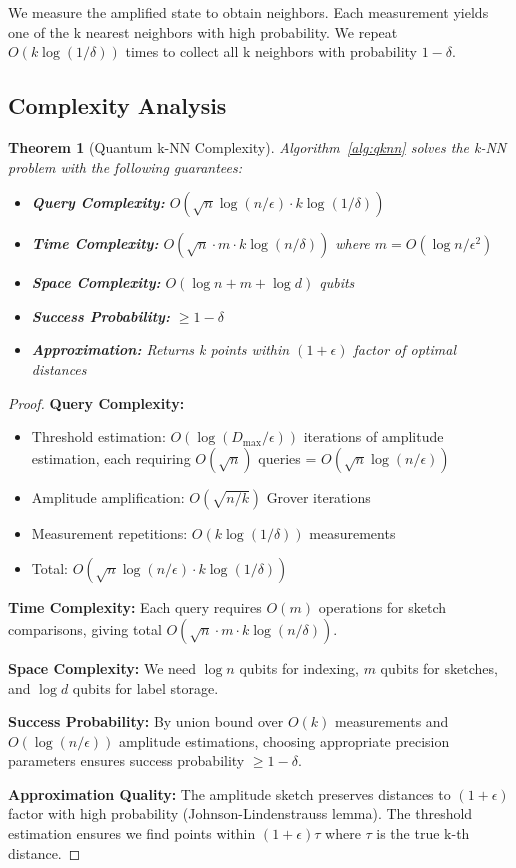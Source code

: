 \documentclass[11pt]{article}
\newtheorem{theorem}{Theorem}
\begin{document}
We measure the amplified state to obtain neighbors. Each measurement yields one of the k nearest neighbors with high probability. We repeat $O(k \log(1/\delta))$ times to collect all k neighbors with probability $1-\delta$.

\subsection{Complexity Analysis}

\begin{theorem}[Quantum k-NN Complexity]
\label{thm:qknn_complexity}
Algorithm~\ref{alg:qknn} solves the k-NN problem with the following guarantees:
\begin{itemize}
    \item \textbf{Query Complexity:} $O(\sqrt{n} \log(n/\epsilon) \cdot k \log(1/\delta))$
    \item \textbf{Time Complexity:} $O(\sqrt{n} \cdot m \cdot k \log(n/\delta))$ where $m = O(\log n / \epsilon^2)$
    \item \textbf{Space Complexity:} $O(\log n + m + \log d)$ qubits
    \item \textbf{Success Probability:} $\geq 1 - \delta$
    \item \textbf{Approximation:} Returns k points within $(1+\epsilon)$ factor of optimal distances
\end{itemize}
\end{theorem}

\begin{proof}
\textbf{Query Complexity:} 
\begin{itemize}
    \item Threshold estimation: $O(\log(D_{\max}/\epsilon))$ iterations of amplitude estimation, each requiring $O(\sqrt{n})$ queries = $O(\sqrt{n} \log(n/\epsilon))$
    \item Amplitude amplification: $O(\sqrt{n/k})$ Grover iterations
    \item Measurement repetitions: $O(k \log(1/\delta))$ measurements
    \item Total: $O(\sqrt{n} \log(n/\epsilon) \cdot k \log(1/\delta))$
\end{itemize}

\textbf{Time Complexity:} Each query requires $O(m)$ operations for sketch comparisons, giving total $O(\sqrt{n} \cdot m \cdot k \log(n/\delta))$.

\textbf{Space Complexity:} We need $\log n$ qubits for indexing, $m$ qubits for sketches, and $\log d$ qubits for label storage.

\textbf{Success Probability:} By union bound over $O(k)$ measurements and $O(\log(n/\epsilon))$ amplitude estimations, choosing appropriate precision parameters ensures success probability $\geq 1-\delta$.

\textbf{Approximation Quality:} The amplitude sketch preserves distances to $(1+\epsilon)$ factor with high probability (Johnson-Lindenstrauss lemma). The threshold estimation ensures we find points within $(1+\epsilon)\tau$ where $\tau$ is the true k-th distance.
\end{proof}
\end{document}
